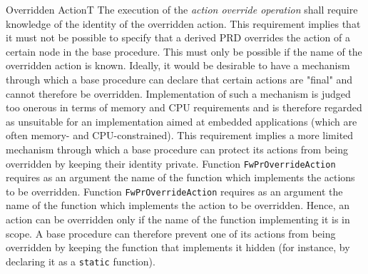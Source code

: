 \documentclass[a4paper,10pt]{article}
\newenvironment{fw_req_note}[7]
{\addtocounter{subsubsection}{1}
	\hspace{0.2cm}\textbf{FW-\arabic{section}.\arabic{subsection}.\arabic{subsubsection}/#2
	\hspace{0.8cm} #1}
	\vspace{-10pt}
\begin{longtable}{p{2.7cm}P{8.5cm}}
\hline
\textsc{Requirement} & #3 \\
\textsc{Note} & #4 \\
\textsc{Justification} & #5 \\
\textsc{Implementation} & #6  \\ 
\textsc{Verification} & #7  \\
\hline
}
{\end{longtable}}
\begin{document}
\begin{fw_req_note}{Overridden Action}{T}
{The execution of the \emph{action override operation} shall require knowledge of the identity of the overridden action.}
{This requirement implies that it must not be possible to specify that a derived PRD overrides the action of a certain 
node in the base procedure. This must only be possible if the name of the overridden action is known.}
{Ideally, it would be desirable to have a mechanism through which a base procedure can declare that certain actions 
are "final" and cannot therefore be overridden. Implementation of such a mechanism is judged too onerous in terms of memory and CPU requirements 
and is therefore regarded as unsuitable for an implementation aimed at embedded applications (which are often memory- and CPU-constrained). 
This requirement implies a more limited mechanism through which a base procedure can protect its actions from being overridden by keeping 
their identity private.}
{Function \texttt{FwPrOverrideAction} requires as an argument the name of the function which implements the actions to be overridden.} 
{Function \texttt{FwPrOverrideAction} requires as an argument the name of the function which implements the action to be overridden. 
Hence, an action can be overridden only if the name of the function implementing it is in scope. A base procedure can therefore prevent one of its actions 
from being overridden by keeping the function that implements it hidden (for instance, by declaring it as a \texttt{static} function).}
\end{fw_req_note}


\end{document}
